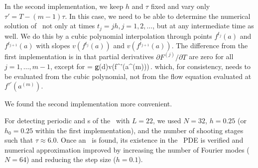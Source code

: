 In the second implementation, we keep $h$ and $\tau$ fixed and vary
only $\tau' = T - (m-1)\tau$.  In this case, we need to be able
to determine the numerical solution of \KSe\ not only at times 
$t_j = jh, j = 1, 2, \ldots$, but at any intermediate time as well.
We do this by a cubic polynomial interpolation through points
$f^{t_j}(a)$ and $f^{t_{j+1}}(a)$ with slopes $v(f^{t_j}(a))$ and
$v(f^{t_{j+1}}(a))$.  The difference from the first implementation
is in that partial derivatives $\partial F^{(j)}/\partial T$ are
zero for all $j = 1,\ldots,m-1$, except for
\beq
   = 
  {\bf g}(d)v(f^{\tau'}(a^{(m)}))\,.
\eeq
which, for consistency, needs to be evaluated from the cubic 
polynomial, not from the flow equation evaluated 
at $f^{\tau'}(a^{(m)})$.

We found the second implementation more convenient.

For detecting periodic and \rpo s of the \KSe\ with $L = 22$, we used
$N = 32$, $h = 0.25$ (or $h_0 = 0.25$ within the first implementation),
and the number of shooting stages such that $\tau \approx 6.0$.
Once an \rpo\ is found, its existence in the \KS\ PDE is verified 
and numerical approximation improved by increasing the number of
Fourier modes ($N = 64$) and reducing the step size ($h = 0.1$).  
